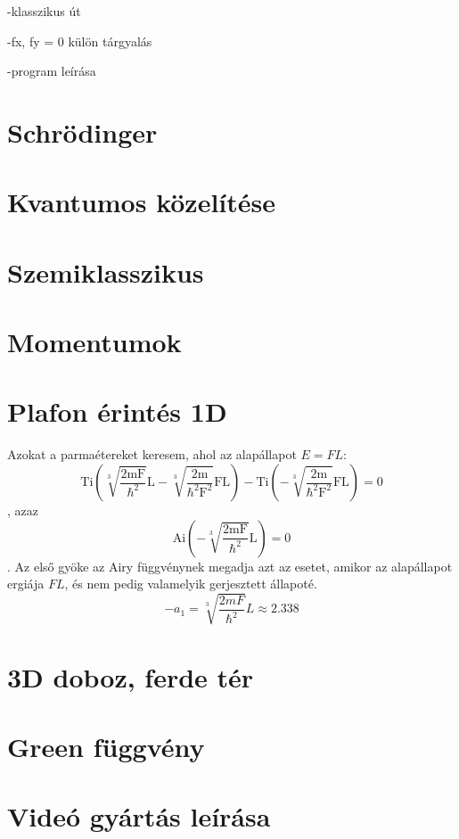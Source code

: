 \documentclass[a4paper,titlepage]{article}
\newcommand{\Ai}[1]{\mathrm{Ai\left(#1\right)}}
\newcommand{\Ti}[1]{\mathrm{Ti\left(#1\right)}}
\begin{document}
	-klasszikus út
	
	-fx, fy = 0 külön tárgyalás
	
	-program leírása
\section{Schrödinger}
	
\section{Kvantumos közelítése}
	
\section{Szemiklasszikus}
	
\section{Momentumok}
	
	
\section{Plafon érintés 1D}
	Azokat a parmaétereket keresem, ahol az alapállapot $E = FL$:
	\begin{equation}
		\Ti{\sqrt[3]{\frac{2mF}{\hbar^2}}L - \sqrt[3]{\frac{2m}{\hbar^2F^2}}FL} - \Ti{-\sqrt[3]{\frac{2m}{\hbar^2F^2}}FL} = 0
	\end{equation}
	, azaz
	\begin{equation}
		\Ai{-\sqrt[3]{\frac{2mF}{\hbar^2}}L} = 0
	\end{equation}
	. Az első gyöke az Airy függvénynek megadja azt az esetet, amikor az alapállapot ergiája $FL$, és nem pedig valamelyik gerjesztett állapoté.
	\begin{equation}
		-a_1 = \sqrt[3]{\frac{2mF}{\hbar^2}}L \approx 2.338
	\end{equation}



\section{3D doboz, ferde tér}
    
    
\section{Green függvény}
	
    
\section{Videó gyártás leírása}
    
    
    
\end{document}
